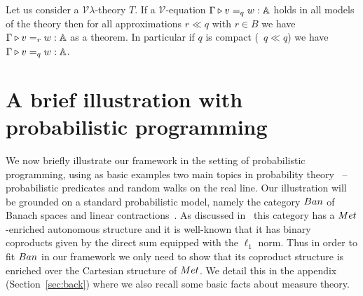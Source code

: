 \documentclass[a4paper,UKenglish,cleveref, autoref, thm-restate]{lipics-v2021}
\begin{document}
\begin{theorem}
        Let us consider a $\mathcal{V}\lambda$-theory $T$.  If a
        $\mathcal{V}$-equation $\Gamma \triangleright v =_q w : \mathbb{A}$ holds in all
        models of the theory then for all approximations $r \ll q$ with $r \in
        B$ we have $\Gamma \triangleright v =_r w : \mathbb{A}$ as a theorem. In particular
        if $q$ is compact (\ie\ $q \ll q$) we have $\Gamma \triangleright v =_q w :
        \mathbb{A}$.
\end{theorem}

\section{A brief illustration with probabilistic programming}
\label{sec:ex}

We now briefly illustrate our framework in the setting of probabilistic
programming, using as basic examples two main topics in probability
theory~\cite{dudley18} -- probabilistic predicates and random walks on the real
line.  Our illustration will be grounded on a standard probabilistic model,
namely the category $\Ban$ of Banach spaces and linear
contractions~\cite{dahlqvist19}. As discussed
in~\cite{dahlqvist22,dahlqvist2023syntactic} this category has a
$\Met$-enriched autonomous structure and it is well-known that it has binary
coproducts given by the direct sum equipped with the $\ell_1$ norm. Thus in
order to fit $\Ban$ in our framework we only need to show that its coproduct
structure is enriched over the Cartesian structure of $\Met$. We detail this in
the appendix (Section~\ref{sec:back}) where we also recall some basic facts
about measure theory.
\end{document}
